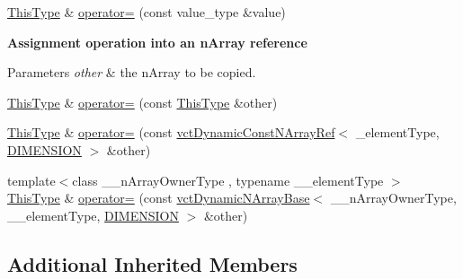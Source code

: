\begin{DoxyCompactItemize}
\item 
\hyperlink{classvct_dynamic_n_array_ref_a157266ffe0ad737f4df13dcf499a4494}{This\-Type} \& \hyperlink{classvct_dynamic_n_array_ref_a8fca22e4d48e70c120d3ef2c4a09b641}{operator=} (const value\-\_\-type \&value)
\end{DoxyCompactItemize}
\begin{Indent}{\bf Assignment operation into an n\-Array reference}\par
{\em 
\begin{DoxyParams}{Parameters}
{\em other} & the n\-Array to be copied. \\
\hline
\end{DoxyParams}
}\begin{DoxyCompactItemize}
\item 
\hyperlink{classvct_dynamic_n_array_ref_a157266ffe0ad737f4df13dcf499a4494}{This\-Type} \& \hyperlink{classvct_dynamic_n_array_ref_ad5f88bdb7321149e4e04a88e2816d3e9}{operator=} (const \hyperlink{classvct_dynamic_n_array_ref_a157266ffe0ad737f4df13dcf499a4494}{This\-Type} \&other)
\item 
\hyperlink{classvct_dynamic_n_array_ref_a157266ffe0ad737f4df13dcf499a4494}{This\-Type} \& \hyperlink{classvct_dynamic_n_array_ref_ad895d2b6e63062664036f3e7fadffdc0}{operator=} (const \hyperlink{classvct_dynamic_const_n_array_ref}{vct\-Dynamic\-Const\-N\-Array\-Ref}$<$ \-\_\-element\-Type, \hyperlink{classvct_dynamic_n_array_ref_a92161a3e7a42576d3442eaf7bae097c1aa639cdab72a595c9cb324af98946bab5}{D\-I\-M\-E\-N\-S\-I\-O\-N} $>$ \&other)
\item 
{\footnotesize template$<$class \-\_\-\-\_\-n\-Array\-Owner\-Type , typename \-\_\-\-\_\-element\-Type $>$ }\\\hyperlink{classvct_dynamic_n_array_ref_a157266ffe0ad737f4df13dcf499a4494}{This\-Type} \& \hyperlink{classvct_dynamic_n_array_ref_a589dd9b7637924042ed4f45176afd9f8}{operator=} (const \hyperlink{classvct_dynamic_n_array_base}{vct\-Dynamic\-N\-Array\-Base}$<$ \-\_\-\-\_\-n\-Array\-Owner\-Type, \-\_\-\-\_\-element\-Type, \hyperlink{classvct_dynamic_n_array_ref_a92161a3e7a42576d3442eaf7bae097c1aa639cdab72a595c9cb324af98946bab5}{D\-I\-M\-E\-N\-S\-I\-O\-N} $>$ \&other)
\end{DoxyCompactItemize}
\end{Indent}
\subsection*{Additional Inherited Members}


